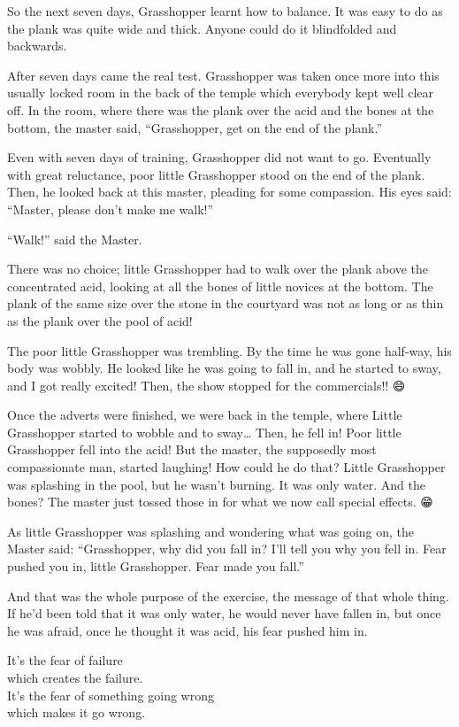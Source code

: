 \documentclass[12pt, openany]{book}
\newenvironment{aphorism}%
{%
\begin{center}\begin{itshape}
}%
{\end{itshape}\end{center}
}%
\begin{document}
So the next seven days, Grasshopper learnt how to balance. It was easy to do as the plank was quite wide and thick. Anyone could do it blindfolded and backwards. 

After seven days came the real test. Grasshopper was taken once more into this usually locked room in the back of the temple which everybody kept well clear off. In the room, where there was the plank over the acid and the bones at the bottom, the master said, “Grasshopper, get on the end of the plank.” 

Even with seven days of training, Grasshopper did not want to go. Eventually with great reluctance, poor little Grasshopper stood on the end of the plank. Then, he looked back at this master, pleading for some compassion. His eyes said: “Master, please don’t make me walk!” 

“Walk!” said the Master. 

There was no choice; little Grasshopper had to walk over the plank above the concentrated acid, looking at all the bones of little novices at the bottom. The plank of the same size over the stone in the courtyard was not as long or as thin as the plank over the pool of acid! 

The poor little Grasshopper was trembling. By the time he was gone half-way, his body was wobbly. He looked like he was going to fall in, and he started to sway, and I got really excited! Then, the show stopped for the commercials!! 😄

Once the adverts were finished, we were back in the temple, where Little Grasshopper started to wobble and to sway… Then, he fell in! Poor little Grasshopper fell into the acid! But the master, the supposedly most compassionate man, started laughing! How could he do that? Little Grasshopper was splashing in the pool, but he wasn’t burning. It was only water. And the bones? The master just tossed those in for what we now call special effects. 😁

As little Grasshopper was splashing and wondering what was going on, the Master said: “Grasshopper, why did you fall in? I’ll tell you why you fell in. Fear pushed you in, little Grasshopper. Fear made you fall.” 

And that was the whole purpose of the exercise, the message of that whole thing. If he’d been told that it was only water, he would never have fallen in, but once he was afraid, once he thought it was acid, his fear pushed him in. 

\begin{aphorism}
It’s the fear of failure\\  
which creates the failure.\\ 
It’s the fear of something going wrong\\  
which makes it go wrong.
\end{aphorism}
\end{document}

